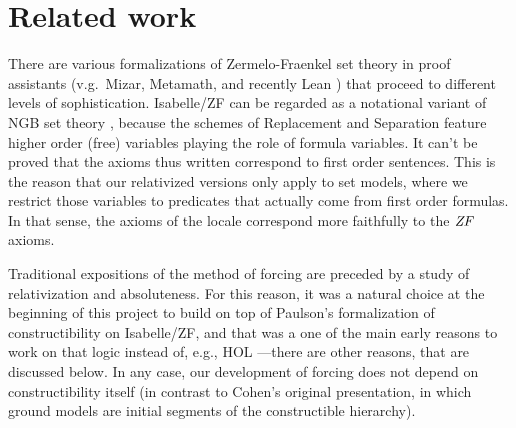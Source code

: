 \section{Related work}
\label{sec:related-work}


There are various formalizations of Zermelo-Fraenkel set theory in
proof assistants (v.g.\ Mizar, Metamath, and recently Lean
\cite{DBLP:conf/cade/MouraKADR15}) that proceed to different levels of
sophistication. Isabelle/ZF can be regarded as a notational variant of
NGB set theory \cite[Sect.~II.10]{kunen2011set}, because the schemes
of Replacement and Separation feature higher order (free) variables
playing the role of formula variables. It can't be proved that the
axioms thus written correspond to first order sentences. This is the
reason that our relativized versions only apply to set models, where
we restrict those variables to predicates that actually come
from first order formulas. In that sense, the axioms of the locale
 correspond more faithfully to the
$\mathit{ZF}$ axioms.

Traditional expositions of the method of forcing
\cite{kunen2011set,Jech_Millennium} are preceded by a study of
relativization and absoluteness. For this reason, it was a natural
choice at the beginning of this project to build on top of Paulson's
formalization of constructibility on Isabelle/ZF, and that was a one
of the main early reasons to work on that logic instead of, e.g., HOL
---there are other reasons, that are discussed below. In any case, our
development of forcing does not depend on constructibility
itself (in contrast to Cohen's
original presentation, in which ground models are initial segments of the
constructible hierarchy).

